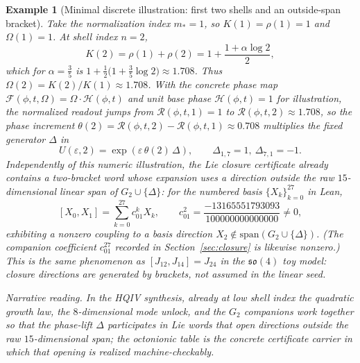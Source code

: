 \documentclass[11pt]{amsart}
\newtheorem{example}[theorem]{Example}
\begin{document}
\begin{example}[Minimal discrete illustration: first two shells and an outside-span bracket]
Take the normalization index \(m_\ast=1\), so \(K(1)=\rho(1)=1\) and \(\Omega(1)=1\). At shell index \(n=2\),
\[
K(2)=\rho(1)+\rho(2)=1+\frac{1+\alpha\log 2}{2},
\]
which for \(\alpha=\tfrac35\) is \(1+\tfrac12\bigl(1+\tfrac35\log 2\bigr)\approx 1.708\). Thus \(\Omega(2)=K(2)/K(1)\approx 1.708\). With the concrete phase map \(\mathcal F(\phi,t,\Omega)=\Omega\cdot\mathcal H(\phi,t)\) and unit base phase \(\mathcal H(\phi,t)=1\) for illustration, the normalized readout jumps from \(\mathcal R(\phi,t,1)=1\) to \(\mathcal R(\phi,t,2)\approx 1.708\), so the phase increment \(\theta(2)=\mathcal R(\phi,t,2)-\mathcal R(\phi,t,1)\approx 0.708\) multiplies the fixed generator \(\Delta\) in
\[
U(\varepsilon,2)=\exp(\varepsilon\,\theta(2)\,\Delta),\qquad \Delta_{1,7}=1,\ \Delta_{7,1}=-1.
\]
Independently of this numeric illustration, the Lie closure certificate already contains a two-bracket word whose expansion uses a direction outside the raw \(15\)-dimensional linear span of \(G_2\cup\{\Delta\}\): for the numbered basis \(\{X_k\}_{k=0}^{27}\) in Lean,
\[
[X_0,X_1]=\sum_{k=0}^{27} c_{01}^k X_k,
\qquad
c_{01}^{2}=\frac{-13165551793093}{100000000000000}\neq 0,
\]
exhibiting a nonzero coupling to a basis direction \(X_2\notin \mathrm{span}(G_2\cup\{\Delta\})\). (The companion coefficient \(c_{01}^{27}\) recorded in Section~\ref{sec:closure} is likewise nonzero.) This is the same phenomenon as \([J_{12},J_{14}]=J_{24}\) in the \(\mathfrak{so}(4)\) toy model: closure directions are generated by brackets, not assumed in the linear seed.

\smallskip
\noindent\textit{Narrative reading.} In the HQIV synthesis, already at low shell index the quadratic growth law, the \(8\)-dimensional mode unlock, and the \(G_2\) companions work together so that the phase-lift \(\Delta\) participates in Lie words that open directions outside the raw \(15\)-dimensional span; the octonionic table is the concrete certificate carrier in which that opening is realized machine-checkably.
\end{example}
\end{document}
